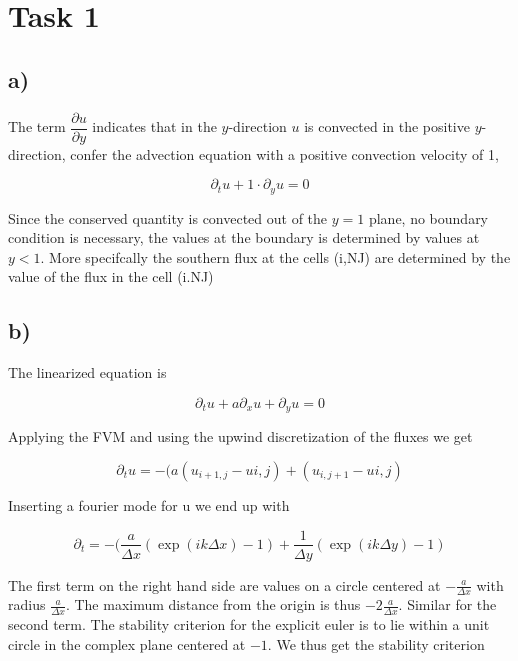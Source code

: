 \documentclass{article}
\begin{document}

\section{Task 1}

\subsection{a)}
The term $\dfrac{\partial u}{\partial y}$ indicates that in the $y$-direction $u$ is convected in the positive $y$-direction, confer the advection equation with a positive convection velocity of 1,

\begin{equation}
\partial_t u + 1 \cdot \partial_y u = 0
\end{equation}

Since the conserved quantity is convected out of the $y=1$ plane, no boundary condition is necessary, the values at the boundary is determined by values at $y<1$. More specifcally the southern flux at the cells (i,NJ) are determined by the value of the flux in the cell (i.NJ)

\subsection{b)}
The linearized equation is

\begin{equation}
\partial_t u + a \partial_x u + \partial_y u = 0
\end{equation}

Applying the FVM and using the upwind discretization of the fluxes we get

\begin{equation}
\partial_t u = -( a(u_{i+1,j} - u{i,j}) + (u_{i,j+1} - u{i,j} )
\end{equation}

Inserting a fourier mode for u we end up with

\begin{equation}
\partial_t = - (\frac{a}{\Delta x} (\exp(ik\Delta x) -1) + \frac{1}{\Delta y} (\exp(ik\Delta y) -1)
\end{equation}

The first term on the right hand side are values on a circle centered at $-\frac{a}{\Delta x}$ with radius $\frac{a}{\Delta x} $. The maximum distance from the origin is thus $-2\frac{a}{\Delta x}$. Similar for the second term. The stability criterion for the explicit euler is to lie within a unit circle in the complex plane centered at $-1$. We thus get the stability criterion
\end{document}
